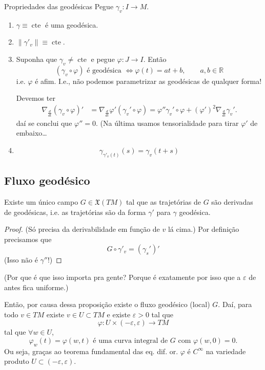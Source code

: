 \begin{thing8}{Propriedades das geodésicas}\leavevmode
Pegue \(\gamma_v:I \to M\).
	\begin{enumerate}
\item \(\gamma \equiv \operatorname{cte}\) é uma geodésica.
\item \(\|\gamma'_v\|\equiv \operatorname{cte}\).
\item Suponha que \(\gamma_v \neq  \operatorname{cte}\) e pegue \(\varphi:J \to I\). Então
	\[(\gamma_v \circ \varphi)\text{ é geodésica } \iff \varphi(t)=at+b, \qquad a,b \in \mathbb{R}\]
	i.e. \(\varphi\) é afim. I.e., não podemos parametrizar as geodésicas de qualquer forma!

	Devemos ter
\begin{align*}
\nabla_{\frac{d}{dt}}(\gamma_v \circ \varphi)'&=\nabla_{\frac{d}{dt}}\varphi'(\gamma_v' \circ \varphi)=\varphi'' \gamma_v' \circ \varphi+ (\varphi')^2\nabla_{\frac{d}{dt}}\gamma_v'.
\end{align*}
daí se conclui que \(\varphi''=0\). (Na última usamos tensorialidade para tirar \(\varphi'\) de embaixo…

\item
	\[\gamma_{\gamma'_v(t)}(s)=\gamma_v(t+s)\]
\end{enumerate}
\end{thing8}

\subsection{Fluxo geodésico}

\begin{prop}\leavevmode
Existe um único campo \(G \in \mathfrak{X}(TM)\) tal que as trajetórias de \(G\) são derivadas de geodésicas, i.e. as trajetórias são da forma \(\gamma'\) para \(\gamma\) geodésica.
\end{prop}

\begin{proof}\leavevmode
(Só precisa da derivabilidade em função de \(v\) lá cima.) Por definição precisamos que 
\[G \circ \gamma'_v=(\gamma_s')'\]
(Isso não é \(\gamma''\)!)
\end{proof}

(Por que é que isso importa pra gente? Porque é exatamente por isso que a \(\varepsilon\) de antes fica uniforme.)

Então, por causa dessa proposição existe o fluxo geodésico (local) \(G\). Daí, para todo \(v \in TM\) existe \(v \in U \subset TM\) e existe \(\varepsilon>0\) tal que
\[\varphi: U \times (-\varepsilon,\varepsilon) \longrightarrow TM\]
tal que \(\forall  w \in U\),
\[\varphi_w(t)=\varphi(w,t)\text{ é uma curva integral de \(G\) com \(\varphi(w,0)=0\).} \]
Ou seja, graças ao teorema fundamental das eq. dif. or. \(\varphi\) é \(C^\infty\) na variedade produto \(U \subset (-\varepsilon,\varepsilon)\).

